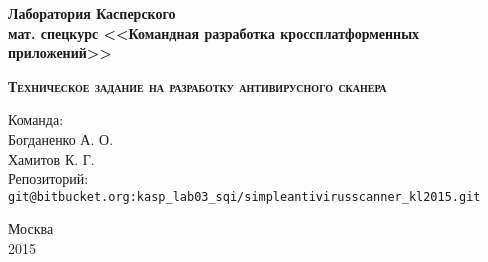 \begin{titlepage}
\begin{center}
{\bfseries
    Лаборатория Касперского \\
    мат. спецкурс
    <<Командная разработка кроссплатформенных приложений>>  \\ [5cm]
}

{\scshape \LARGE \bfseries
    Техническое задание на разработку антивирусного сканера} \\ [1cm]
\end{center}
\begin{flushright}
Команда: \\
Богданенко А. О. \\
Хамитов К. Г. \\ [1cm]
Репозиторий: \\
\verb!git@bitbucket.org:kasp_lab03_sqi/simpleantivirusscanner_kl2015.git!
\end{flushright}
\vfill
\begin{center}
Москва \\
2015
\end{center}
\end{titlepage}

